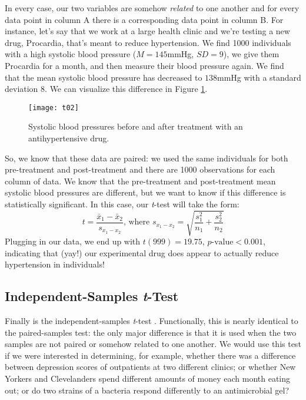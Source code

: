 In every case, our two variables are somehow \textit{related} to one another and for every data point in column A there is a corresponding data point in column B. For instance, let's say that we work at a large health clinic and we're testing a new drug, Procardia, that's meant to reduce hypertension. We find 1000 individuals with a high systolic blood pressure ($M=145$mmHg, $SD=9$), we give them Procardia for a month, and then measure their blood pressure again. We find that the mean systolic blood pressure has decreased to $138$mmHg with a standard deviation $8$. We can visualize this difference in Figure \ref{fig:t02}.

\begin{figure}[htp]
\texttt{[image: t02]}
\caption{Systolic blood pressures before and after treatment with an antihypertensive drug.}
\label{fig:t02}
\end{figure}

So, we know that these data are paired: we used the same individuals for both pre-treatment and post-treatment and there are 1000 observations for each column of data. We know that the pre-treatment and post-treatment mean systolic blood pressures are different, but we want to know if this difference is statistically significant. In this case, our \textit{t}-test will take the form:
\begin{equation}
t=\frac{\bar{x}_1-\bar{x}_2}{s_{x_1-x_2}}\text{, where }s_{x_1-x_2}=\sqrt{\frac{s_1^2}{n_1}+\frac{s_2^2}{n_2}}
\end{equation}
Plugging in our data, we end up with $t(999)=19.75$, $p\text{-value}<0.001$, indicating that (yay!) our experimental drug does appear to actually reduce hypertension in individuals!

\subsection{Independent-Samples \textit{t}-Test}

Finally is the independent-samples \textit{t}-test . Functionally, this is nearly identical to the paired-samples test: the only major difference is that it is used when the two samples are not paired or somehow related to one another. We would use this test if we were interested in determining, for example, whether there was a difference between depression scores of outpatients at two different clinics; or whether New Yorkers and Clevelanders spend different amounts of money each month eating out; or do two strains of a bacteria respond differently to an antimicrobial gel?

